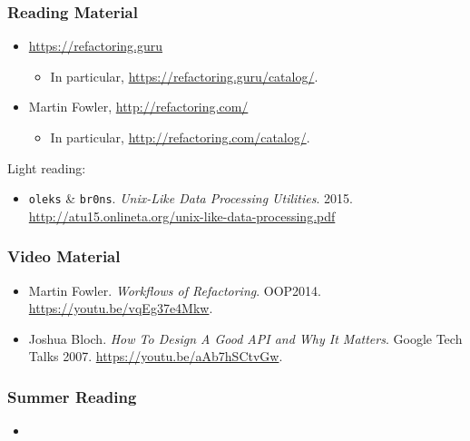 \begin{frame}

\frametitle{Reading Material}

\footnotesize

\begin{itemize}

\item \url{https://refactoring.guru}

\begin{itemize}

\item In particular, \url{https://refactoring.guru/catalog/}.

\end{itemize}

\item Martin Fowler, \url{http://refactoring.com/}

\begin{itemize}

\item In particular, \url{http://refactoring.com/catalog/}.

\end{itemize}

\end{itemize}

Light reading:

\begin{itemize}

\item \texttt{oleks} \& \texttt{br0ns}. \emph{Unix-Like Data Processing
Utilities}. 2015. \url{http://atu15.onlineta.org/unix-like-data-processing.pdf}

\end{itemize}

\end{frame}


\begin{frame}

\frametitle{Video Material}

\footnotesize

\begin{itemize}

\item Martin Fowler. \emph{Workflows of Refactoring}. OOP2014.
\url{https://youtu.be/vqEg37e4Mkw}.

\item Joshua Bloch. \emph{How To Design A Good API and Why It Matters}. Google
Tech Talks 2007. \url{https://youtu.be/aAb7hSCtvGw}.

%

\end{itemize}

\end{frame}


\begin{frame}

\frametitle{Summer Reading}

\footnotesize

\begin{itemize}

\item

\end{itemize}

\end{frame}
